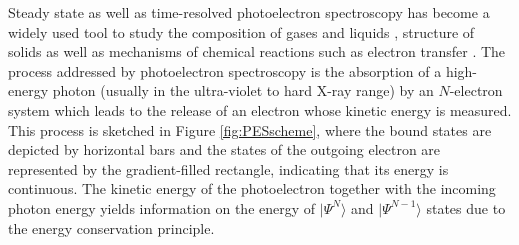 Steady state as well as time-resolved photoelectron spec\-tros\-co\-py has become a widely used tool to study the composition of gases and liquids \cite{winterWater,liquid1,XrayDynamics,hafied}, structure of solids \cite{solid1} as well as mechanisms of chemical reactions such as electron transfer \cite{XrayDynamics}.
The process addressed by photoelectron spec\-tros\-co\-py is the absorption of a high-energy photon (usually in the ultra-violet to hard X-ray range) by an $N$-electron system which leads to the release of an electron whose kinetic energy is measured.
This process is sketched in Figure \ref{fig:PESscheme}, where the bound states are depicted by horizontal bars and the states of the outgoing electron are represented by the gradient-filled rectangle, indicating that its energy is continuous.
The kinetic energy of the photoelectron together with the incoming photon energy yields information on the energy of $|\Psi^N \rangle$ and $|\Psi^{N-1} \rangle$ states due to the energy conservation principle.

